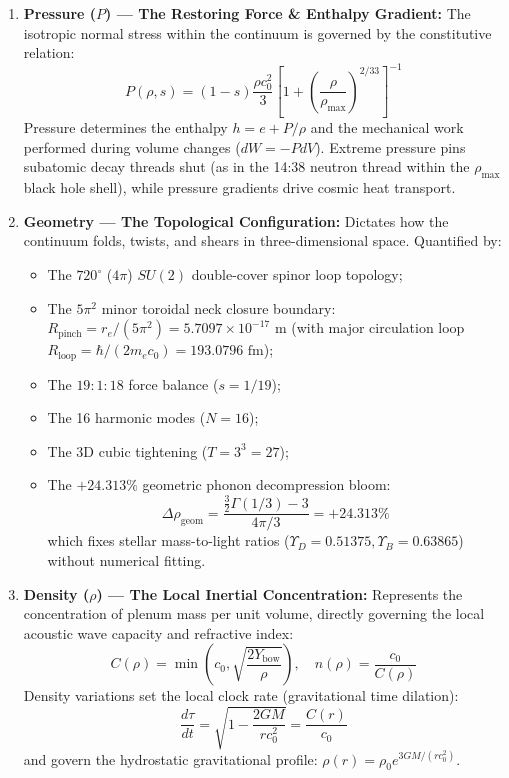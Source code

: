 \documentclass[11pt,a4paper]{article}
\begin{document}
\begin{enumerate}
    \item \textbf{Pressure ($P$) --- The Restoring Force \& Enthalpy Gradient:} The isotropic normal stress within the continuum is governed by the constitutive relation:
    \begin{equation}
    P(\rho, s) = (1 - s) \frac{\rho c_0^2}{3} \left[ 1 + \left( \frac{\rho}{\rho_{\max}} \right)^{2/33} \right]^{-1}
    \end{equation}
    Pressure determines the enthalpy $h = e + P/\rho$ and the mechanical work performed during volume changes ($dW = -P dV$). Extreme pressure pins subatomic decay threads shut (as in the 14:38 neutron thread within the $\rho_{\max}$ black hole shell), while pressure gradients drive cosmic heat transport.

    \item \textbf{Geometry --- The Topological Configuration:} Dictates how the continuum folds, twists, and shears in three-dimensional space. Quantified by:
    \begin{itemize}
        \item The $720^\circ$ ($4\pi$) $SU(2)$ double-cover spinor loop topology;
        \item The $5\pi^2$ minor toroidal neck closure boundary: $R_{\text{pinch}} = r_e / (5\pi^2) = 5.7097 \times 10^{-17}\text{ m}$ (with major circulation loop $R_{\text{loop}} = \hbar / (2 m_e c_0) = 193.0796\text{ fm}$);
        \item The $19:1:18$ force balance ($s = 1/19$);
        \item The 16 harmonic modes ($N = 16$);
        \item The 3D cubic tightening ($T = 3^3 = 27$);
        \item The $+24.313\%$ geometric phonon decompression bloom:
        \begin{equation}
        \Delta\rho_{\text{geom}} = \frac{\frac{3}{2}\Gamma(1/3) - 3}{4\pi/3} = +24.313\%
        \end{equation}
        which fixes stellar mass-to-light ratios ($\Upsilon_D = 0.51375, \Upsilon_B = 0.63865$) without numerical fitting.
    \end{itemize}

    \item \textbf{Density ($\rho$) --- The Local Inertial Concentration:} Represents the concentration of plenum mass per unit volume, directly governing the local acoustic wave capacity and refractive index:
    \begin{equation}
    C(\rho) = \min\left(c_0, \sqrt{\frac{2Y_{\text{bow}}}{\rho}}\right), \quad n(\rho) = \frac{c_0}{C(\rho)}
    \end{equation}
    Density variations set the local clock rate (gravitational time dilation):
    \begin{equation}
    \frac{d\tau}{dt} = \sqrt{1 - \frac{2GM}{r c_0^2}} = \frac{C(r)}{c_0}
    \end{equation}
    and govern the hydrostatic gravitational profile: $\rho(r) = \rho_0 e^{3GM/(r c_0^2)}$.
\end{enumerate}
\end{document}
